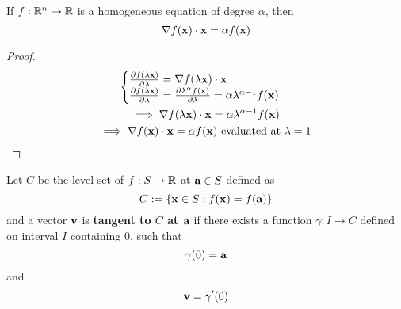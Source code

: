 \documentclass[11pt]{article}
\newcommand{\vex}[0]{\ve{x}}
\newcommand{\vea}[0]{\ve{a}}
\begin{document}
			\begin{theorem}
				If $f: \mathbb{R}^n \to \mathbb{R}$ is a homogeneous equation of degree $\alpha$, then 
				\begin{equation}
					\nabla f(\vex) \cdot \vex = \alpha f(\vex)
				\end{equation}
				\begin{proof}
					\begin{gather}
						\begin{cases}
							\pd{f(\lambda \vex)}{\lambda} = \nabla f(\lambda \vex) \cdot \vex \\
							\pd{f(\lambda \vex)}{\lambda} = \pd{\lambda^\alpha f(\vex)}{\lambda} = \alpha \lambda^{\alpha - 1} f(\vex)
						\end{cases} \\
						\implies \nabla f(\lambda \vex) \cdot \vex = \alpha \lambda^{\alpha - 1} f(\vex) \\
						\implies \nabla f(\vex) \cdot \vex = \alpha f(\vex) \tx{ evaluated at } \lambda = 1
					\end{gather}
				\end{proof}
			\end{theorem}
			
			\begin{definition}
				Let $C$ be the level set of $f: S \to \mathbb{R}$ at $\vea \in S$ defined as 
				\begin{equation}
					C := \{\vex \in S: f(\vex) = f(\vea)\}
				\end{equation}
				and a vector $\textbf{v}$ is \textbf{tangent to $C$ at $\vea$} if there exists a function $\gamma: I \to C$ defined on interval $I$ containing $0$, such that
				\begin{equation}
					\gamma(0) = \vea
				\end{equation}
				and 
				\begin{equation}
					\textbf{v} = \gamma'(0)
				\end{equation}
			\end{definition}
			
\end{document}

